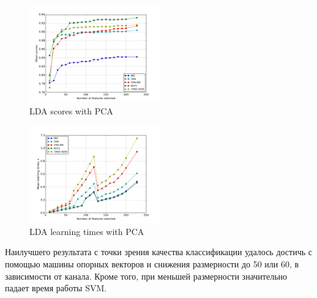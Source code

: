 \begin{figure}[h!]
    \centering
    \includegraphics[width=0.5\textwidth]{images/PCA-LDA.png}
    \caption{LDA scores with PCA}
    \label{fig:lda_pca_scores}
\end{figure} 
\begin{figure}[h!]
    \centering
    \includegraphics[width=0.5\textwidth]{images/PCA-LDATime.png}
    \caption{LDA learning times with PCA}
    \label{fig:lda_pca_times}
\end{figure} 
\par
Наилучшего результата с точки зрения качества классификации удалось достичь с помощью машины опорных векторов и снижения размерности до 50 или 60, в зависимости от канала. Кроме того, при меньшей размерности значительно падает время работы SVM.

